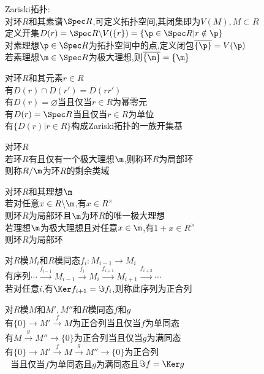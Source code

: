 \begin{dingyi}
Zariski拓扑:\\
对环$R$和其素谱$\Spec R$,可定义拓扑空间,其闭集即为$V(M),M\subset R$\\
定义开集$D(r)=\Spec R\backslash V(\{r\})=\{\p\in \Spec R|r \notin \p\}$\\
对素理想$\p\in \Spec R$为拓扑空间中的点,定义闭包$\overline{\{\p\}}=V(\p)$\\
若素理想$\m\in \Spec R$为极大理想,则$\overline{\{\m\}}=\{\m\}$
\end{dingyi}

\begin{dingli}
对环$R$和其元素$r\in R$\\
有$D(r)\cap D(r')=D(rr')$\\
有$D(r)=\varnothing$当且仅当$r\in R$为幂零元\\
有$D(r)=\Spec R$当且仅当$r\in R$为单位\\
有$\{D(r)|r\in R\}$构成Zariski拓扑的一族开集基
\end{dingli}

\begin{dingyi}
对环$R$\\
若环$R$有且仅有一个极大理想$\m$,则称环$R$为局部环\\
则称$R/\m$为环$R$的剩余类域
\end{dingyi}

\begin{dingli}
对环$R$和其理想$\m$\\
若对任意$x\in R\backslash \m$,有$x\in R^{\times}$\\
则环$R$为局部环且$\m$为环$R$的唯一极大理想\\
若理想$\m$为极大理想且对任意$x\in \m$,有$1+x\in R^{\times}$\\
则环$R$为局部环
\end{dingli}

\begin{dingyi}
对$R$模$M_i$和$R$模同态$f_i:M_{i-1}\to M_i$\\
有序列$\cdots\stackrel{f_{i-1}}{\longrightarrow} M_{i-1}\stackrel{f_{i}}{\longrightarrow} M_i\stackrel{f_{i+1}}{\longrightarrow} M_{i+1}\stackrel{f_{i+2}}{\longrightarrow}\cdots$\\
若对任意$i$,有$\Ker f_{i+1}=\Im f_i$,则称此序列为正合列
\end{dingyi}

\begin{dingli}
对$R$模$M$和$M',M''$和$R$模同态$f$和$g$\\
有$\{0\} \longrightarrow M'\stackrel{f}{\longrightarrow} M$为正合列当且仅当$f$为单同态\\
有$M\stackrel{g}{\longrightarrow} M''\longrightarrow \{0\}$为正合列当且仅当$g$为满同态\\
有$\{0\} \longrightarrow M'\stackrel{f}{\longrightarrow} M\stackrel{g}{\longrightarrow} M''\longrightarrow \{0\}$为正合列\\
{}$\,\,\,\,$当且仅当$f$为单同态且$g$为满同态且$\Im f=\Ker g$
\end{dingli}

